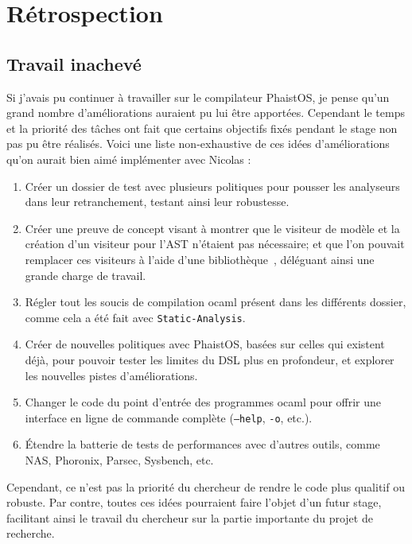 \section{Rétrospection}
\label{hindsight}

\subsection{Travail inachevé}

Si j'avais pu continuer à travailler sur le compilateur PhaistOS, je pense qu'un grand nombre d'améliorations auraient pu lui être apportées. Cependant le temps et la priorité des tâches ont fait que certains objectifs fixés pendant le stage non pas pu être réalisés. Voici une liste non-exhaustive de ces idées d'améliorations qu'on aurait bien aimé implémenter avec Nicolas :

\begin{enumerate}
    \item Créer un dossier de test avec plusieurs politiques pour pousser les analyseurs dans leur retranchement, testant ainsi leur robustesse.
    \item Créer une preuve de concept visant à montrer que le visiteur de modèle et la création d'un visiteur pour l'AST n'étaient pas nécessaire; et que l'on pouvait remplacer ces visiteurs à l'aide d'une bibliothèque~\cite{visitors2021manual}, déléguant ainsi une grande charge de travail.
    \item Régler tout les soucis de compilation ocaml présent dans les différents dossier, comme cela a été fait avec \texttt{Static-Analysis}.
    \item Créer de nouvelles politiques avec PhaistOS, basées sur celles qui existent déjà, pour pouvoir tester les limites du DSL plus en profondeur, et explorer les nouvelles pistes d'améliorations.
    \item Changer le code du point d'entrée des programmes ocaml pour offrir une interface en ligne de commande complète (\texttt{--help}, \texttt{-o}, etc.).
    \item Étendre la batterie de tests de performances avec d'autres outils, comme NAS, Phoronix, Parsec, Sysbench, etc.
\end{enumerate}

Cependant, ce n'est pas la priorité du chercheur de rendre le code plus qualitif ou robuste. Par contre, toutes ces idées pourraient faire l'objet d'un futur stage, facilitant ainsi le travail du chercheur sur la partie importante du projet de recherche. 

